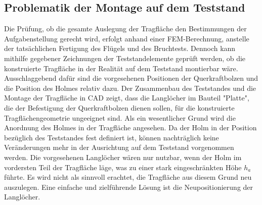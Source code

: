 \subsection{Problematik der Montage auf dem Teststand}
Die Prüfung, ob die gesamte Auslegung der Tragfläche den Bestimmungen der Aufgabenstellung gerecht wird, erfolgt anhand einer FEM-Berechnung, anstelle der tatsächlichen Fertigung des Flügels und des Bruchtests. Dennoch kann mithilfe gegebener Zeichnungen der Teststandelemente geprüft werden, ob die konstruierte Tragfläche in der Realität auf dem Teststand montierbar wäre. Ausschlaggebend dafür sind die vorgesehenen Positionen der Querkraftbolzen und die Position des Holmes relativ dazu. Der Zusammenbau des Teststandes und die Montage der Tragfläche in CAD zeigt, dass die Langlöcher im Bauteil "Platte", die der Befestigung der Querkraftbolzen dienen sollen, für die konstruierte Tragflächengeometrie ungeeignet sind. Als ein wesentlicher Grund wird die Anordnung des Holmes in der Tragfläche angesehen. Da der Holm in der Position bezüglich des Teststandes fest definiert ist, können nachträglich keine Veränderungen mehr in der Ausrichtung auf dem Teststand vorgenommen werden. Die vorgesehenen Langlöcher wären nur nutzbar, wenn der Holm im vordersten Teil der Tragfläche läge, was zu einer stark eingeschränkten Höhe $ h_{a} $ führte. Es wird nicht als sinnvoll erachtet, die Tragfläche aus diesem Grund neu auszulegen. Eine einfache und zielführende Lösung ist die Neupositionierung der Langlöcher.
